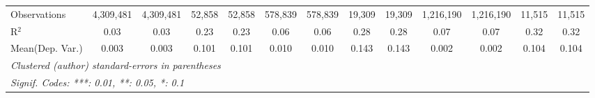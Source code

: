 \begin{tabular}{lcccccccccccc}
   Observations                             & 4,309,481      & 4,309,481        & 52,858  & 52,858        & 578,839        & 578,839         & 19,309       & 19,309         & 1,216,190      & 1,216,190        & 11,515       & 11,515\\  
   R$^2$                                    & 0.03           & 0.03             & 0.23    & 0.23          & 0.06           & 0.06            & 0.28         & 0.28           & 0.07           & 0.07             & 0.32         & 0.32\\  
Mean(Dep. Var.) & 0.003 & 0.003 & 0.101 & 0.101 & 0.010 & 0.010 & 0.143 & 0.143 & 0.002 & 0.002 & 0.104 & 0.104 \\
   \midrule \midrule
   \multicolumn{13}{l}{\emph{Clustered (author) standard-errors in parentheses}}\\
   \multicolumn{13}{l}{\emph{Signif. Codes: ***: 0.01, **: 0.05, *: 0.1}}\\
\end{tabular}
\par\endgroup
